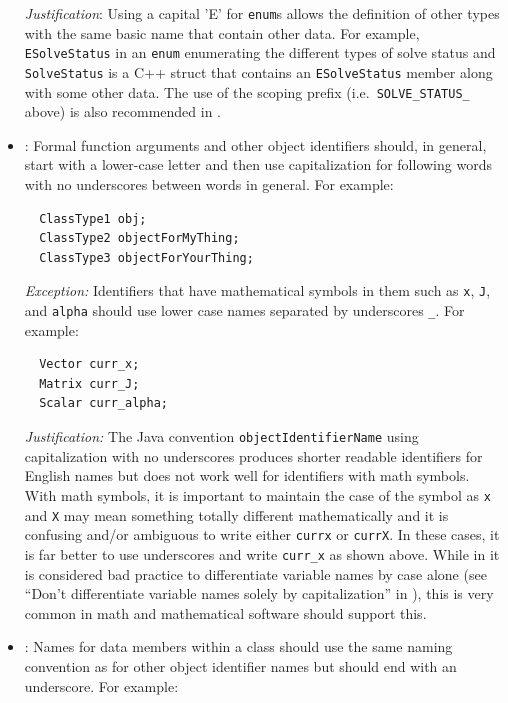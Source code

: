 \begin{itemize}
{}\textit{Justification}: Using a capital 'E' for {}\texttt{enum}s allows the
definition of other types with the same basic name that contain other data.
For example, {}\texttt{ESolveStatus} in an {}\texttt{enum} enumerating the
different types of solve status and {}\texttt{SolveStatus} is a C++ struct
that contains an {}\texttt{ESolveStatus} member along with some other data.
The use of the scoping prefix (i.e.\ {}\texttt{SOLVE\-\_STATUS\_} above) is
also recommended in {}\cite[Section 11.4]{CodeComplete2nd04}.

{}\item\NCObjectNames: Formal function arguments and other object identifiers
should, in general, start with a lower-case letter and then use capitalization
for following words with no underscores between words in general.  For
example:

{\small\begin{verbatim}
  ClassType1 obj;
  ClassType2 objectForMyThing;
  ClassType3 objectForYourThing;
\end{verbatim}}

{}\textit{Exception:} Identifiers that have mathematical symbols in them such
as {}\texttt{x}, {}\texttt{J}, and {}\texttt{alpha} should use lower case
names separated by underscores {}\texttt{\_}.  For example:

{\small\begin{verbatim}
  Vector curr_x;
  Matrix curr_J;
  Scalar curr_alpha;
\end{verbatim}}

{}\textit{Justification:} The Java convention {}\texttt{objectIdentifierName}
using capitalization with no underscores produces shorter readable identifiers
for English names but does not work well for identifiers with math symbols.
With math symbols, it is important to maintain the case of the symbol as
{}\texttt{x} and {}\texttt{X} may mean something totally different
mathematically and it is confusing and/or ambiguous to write either
{}\texttt{currx} or {}\texttt{currX}.  In these cases, it is far better to use
underscores and write {}\texttt{curr\_x} as shown above.  While in it is
considered bad practice to differentiate variable names by case alone (see
``Don't differentiate variable names solely by capitalization'' in
{}\cite[Section 11.7]{CodeComplete2nd04}), this is very common in math and
mathematical software should support this.

{}\item\NCDataMemberNames: Names for data members within a class should use the
same naming convention as for other object identifier names but should end
with an underscore.  For example:


\end{itemize}

